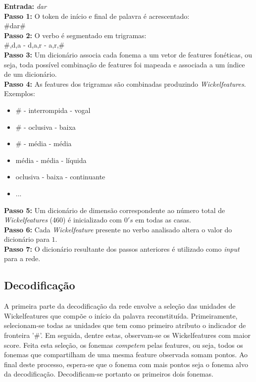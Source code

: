 \textbf{Entrada:} \textit{dar}\\

\textbf{Passo 1:} O token de início e final de palavra é acrescentado:\\
\hspace*{6.0em}      \#dar\#\\

\textbf{Passo 2:} O verbo é segmentado em trigramas:\\
\hspace*{6.0em}\#,d,a - d,a,r - a,r,\#\\

\textbf{Passo 3:} Um dicionário associa cada fonema a um vetor de features fonéticas, ou seja, toda possível combinação de features foi mapeada e associada a um índice de um dicionário. \\

\textbf{Passo 4:} As features dos trigramas são combinadas produzindo \textit{Wickelfeatures}.\\

Exemplos:
\begin{itemize}
\item \# - interrompida - vogal 
\item \# - oclusiva - baixa
\item \# - média - média
\item média - média - líquida
\item oclusiva - baixa - continuante
\item ...
\end{itemize}


\textbf{Passo 5:} Um dicionário de dimensão correspondente ao número total de \textit{Wickelfeatures} (460) é inicializado com $0's$ em todas as casas.\\

\textbf{Passo 6:} Cada \textit{Wickelfeature} presente no verbo analisado altera o valor do dicionário para $1$.\\

\textbf{Passo 7:} O dicionário resultante dos passos anteriores é utilizado como \textit{input} para a rede.

\subsection{Decodificação}
\label{sec:dec}

A primeira parte da decodificação da rede envolve a seleção das unidades de Wickelfeatures que compõe o início da palavra reconstituída. Primeiramente, selecionam-se todas as unidades que tem como primeiro atributo o indicador de fronteira '\#'. Em seguida, dentre estas, observam-se os Wickelfeatures com maior score. Feita esta seleção, os fonemas \textit{competem} pelas features, ou seja, todos os fonemas que compartilham de uma mesma feature observada somam pontos. Ao final deste processo, espera-se que o fonema com mais pontos seja o fonema alvo da decodificação. Decodificam-se portanto os primeiros dois fonemas.

